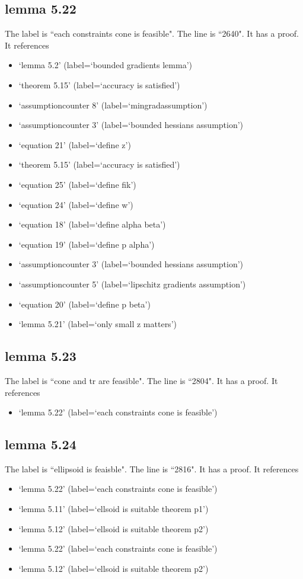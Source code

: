 \documentclass{article}
\begin{document}
\subsection{lemma 5.22}
The label is ``each constraints cone is feasible".
The line is ``2640".
It has a proof.
It references \begin{itemize}
\item `lemma 5.2' (label=`bounded gradients lemma')
\item `theorem 5.15' (label=`accuracy is satisfied')
\item `assumptioncounter 8' (label=`mingradassumption')
\item `assumptioncounter 3' (label=`bounded hessians assumption')
\item `equation 21' (label=`define z')
\item `theorem 5.15' (label=`accuracy is satisfied')
\item `equation 25' (label=`define fik')
\item `equation 24' (label=`define w')
\item `equation 18' (label=`define alpha beta')
\item `equation 19' (label=`define p alpha')
\item `assumptioncounter 3' (label=`bounded hessians assumption')
\item `assumptioncounter 5' (label=`lipschitz gradients assumption')
\item `equation 20' (label=`define p beta')
\item `lemma 5.21' (label=`only small z matters')
\end{itemize}
\subsection{lemma 5.23}
The label is ``cone and tr are feasible".
The line is ``2804".
It has a proof.
It references \begin{itemize}
\item `lemma 5.22' (label=`each constraints cone is feasible')
\end{itemize}
\subsection{lemma 5.24}
The label is ``ellipsoid is feaisble".
The line is ``2816".
It has a proof.
It references \begin{itemize}
\item `lemma 5.22' (label=`each constraints cone is feasible')
\item `lemma 5.11' (label=`ellsoid is suitable theorem p1')
\item `lemma 5.12' (label=`ellsoid is suitable theorem p2')
\item `lemma 5.22' (label=`each constraints cone is feasible')
\item `lemma 5.12' (label=`ellsoid is suitable theorem p2')
\end{itemize}
\end{document}
